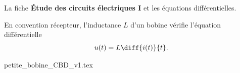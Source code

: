 \debutFicheEntrainement                                                                      %




\begin{prerequis}
	La fiche \textbf{Étude des circuits électriques I} et les équations différentielles.
\end{prerequis}





\bigskip


                                \initialisationPartieGauche %
En convention récepteur, l'inductance $L$ d'un bobine vérifie l'équation différentielle \minusSmallskip
\[
u(t)=L\diff{i(t)}{t}.
\]
                                \initialisationPartieDroite %
\begin{center}
{petite_bobine_CBD_v1.tex}
\end{center}
                               \finalisationDuPartageDePage %





